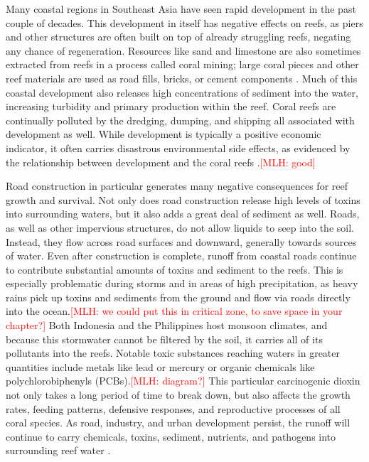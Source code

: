 \documentclass{book}\usepackage{knitr}
\newcommand{\red}[1]{\textcolor{red}{[MLH: #1]}}
\begin{document}
\begin{knitrout}
\begin{kframe}
{Many coastal regions in Southeast Asia have seen rapid development in the past couple of decades. This development in itself has negative effects on reefs, as piers and other structures are often built on top of already struggling reefs, negating any chance of regeneration. Resources like sand and limestone are also sometimes extracted from reefs in a process called coral mining; large coral pieces and other reef materials are used as road fills, bricks, or cement components \citep{coralreefalliance_2021}. Much of this coastal development also releases high concentrations of sediment into the water, increasing turbidity and primary production within the reef. Coral reefs are continually polluted by the dredging, dumping, and shipping all associated with development as well. While development is typically a positive economic indicator, it often carries disastrous environmental side effects, as evidenced by the relationship between development and the coral reefs \citep{USEPA_2017}.\red{good}

Road construction in particular generates many negative consequences for reef growth and survival. Not only does road construction release high levels of toxins into surrounding waters, but it also adds a great deal of sediment as well. Roads, as well as other impervious structures, do not allow liquids to seep into the soil. Instead, they flow across road surfaces and downward, generally towards sources of water. Even after construction is complete, runoff from coastal roads continue to contribute substantial amounts of toxins and sediment to the reefs. This is especially problematic during storms and in areas of high precipitation, as heavy rains pick up toxins and sediments from the ground and flow via roads directly into the ocean.\red{we could put this in critical zone, to save space in your chapter?} Both Indonesia and the Philippines host monsoon climates, and because this stormwater cannot be filtered by the soil, it carries all of its pollutants into the reefs. Notable toxic substances reaching waters in greater quantities include metals like lead or mercury or organic chemicals like polychlorobiphenyls (PCBs).\red{diagram?} This particular carcinogenic dioxin not only takes a long period of time to break down, but also affects the growth rates, feeding patterns, defensive responses, and reproductive processes of all coral species. As road, industry, and urban development persist, the runoff will continue to carry chemicals, toxins, sediment, nutrients, and pathogens into surrounding reef water \citep{USEPA_2017}.

}
\end{kframe}
\end{knitrout}
\end{document}
